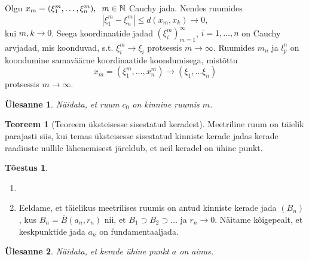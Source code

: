 \documentclass{article}[12pt]
\newcommand{\h}{\hspace{0.2cm}}
\newcommand{\N}{\mathbb{N}}
\newtheorem{yl}{Ülesanne}[section]
\theoremstyle{definition}
\theoremstyle{definition}
\newtheorem{theorem}{Teoreem}[section]
\theoremstyle{definition}
\theoremstyle{break}
\newtheorem*{toestus}{Tõestus}
\begin{document}
Olgu $x_m=(\xi_1^m,\dots,\xi_n^m),\h m\in\N$ Cauchy jada.
Nendes ruumides
\[
	|\xi_1^m-\xi_n^m|\leq d(x_m,x_k) \rightarrow 0,
\]
kui $m,k\rightarrow 0$.
Seega koordinaatide jadad $(\xi_i^m)_{m=1}^\infty$, $i=1,\dots,n$ on Cauchy arvjadad, mis koonduvad, s.t. $\xi_i^m\rightarrow\xi_i$ protsessis $m\rightarrow\infty$.
Ruumides $m_n$ ja $l_p^n$ on koondumine samaväärne koordinaatide koondumisega, mistõttu 
\[
	x_m = (\xi_1^m,\dots,x_n^m) \rightarrow (\xi_1,\dots \xi_n)
\]
protsessis $m\rightarrow \infty$.

\begin{yl}
	Näidata, et ruum $c_0$ on kinnine ruumis $m$.
\end{yl}

\begin{theorem}[Teoreem üksteisesse sisestatud keradest]
	Meetriline ruum on täielik parajasti siis, kui temas üksteisesse sisestatud kinniste kerade jadas kerade raadiuste nullile lähenemisest järeldub, et neil keradel on ühine punkt.
\end{theorem}
\begin{toestus}
	\begin{enumerate}
		\item[]
		\item Eeldame, et täielikus meetrilises ruumis on antud kinniste kerade jada $(B_n)$, kus $B_n = \overline{B}(a_n,r_n)$ nii, et $B_1\supset B_2\supset \dots$ ja $r_n\rightarrow 0$.
		Näitame kõigepealt, et keskpunktide jada $a_n$ on fundamentaaljada.
	\end{enumerate}
\end{toestus}

\begin{yl}
	Näidata, et kerade ühine punkt $a$ on ainus.
\end{yl}
\end{document}

